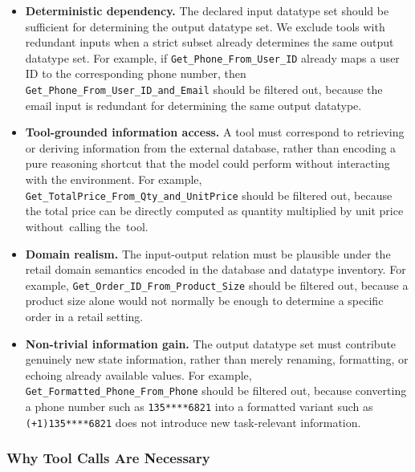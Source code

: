 \documentclass{llmxive}
\begin{document}
\begin{itemize}
    \item \textbf{Deterministic dependency.} The declared input datatype set should be sufficient for determining the output datatype set. We exclude tools with redundant inputs when a strict subset already determines the same output datatype set. For example, if \texttt{Get\_Phone\_From\_User\_ID} already maps a user ID to the corresponding phone number, then \texttt{Get\_Phone\_From\_User\_ID\_and\_Email} should be filtered out, because the email input is redundant for determining the same output datatype.
    \item \textbf{Tool-grounded information access.} A tool must correspond to retrieving or deriving information from the external database, rather than encoding a pure reasoning shortcut that the model could perform without interacting with the environment. For example, \texttt{Get\_TotalPrice\_From\_Qty\_and\_UnitPrice} should be filtered out, because the total price can be directly computed as quantity multiplied by unit price without~calling the~tool.
    \item \textbf{Domain realism.} The input-output relation must be plausible under the retail domain semantics encoded in the database and datatype inventory. For example, \texttt{Get\_Order\_ID\_From\_Product\_Size} should be filtered out, because a product size alone would not normally be enough to determine a specific order in a retail setting.
    \item \textbf{Non-trivial information gain.} The output datatype set must contribute genuinely new state information, rather than merely renaming, formatting, or echoing already available values. For example, \texttt{Get\_Formatted\_Phone\_From\_Phone} should be filtered out, because converting a phone number such as \texttt{135****6821} into a formatted variant such as \texttt{(+1)135****6821} does not introduce new task-relevant information.
\end{itemize}

\subsubsection{Why Tool Calls Are Necessary}
\label{app:tools-necessity-details}
\end{document}
